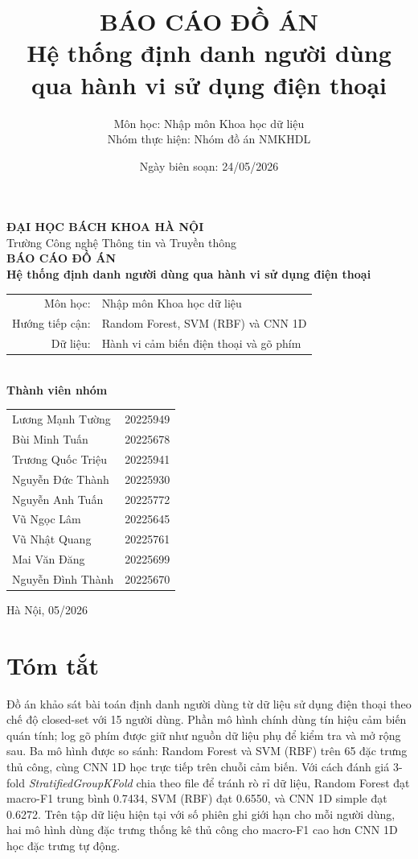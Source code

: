 \documentclass[12pt,a4paper]{article}
\title{\textbf{BÁO CÁO ĐỒ ÁN}\\[0.4cm]
\Large Hệ thống định danh người dùng qua hành vi sử dụng điện thoại}
\author{
Môn học: Nhập môn Khoa học dữ liệu\\
Nhóm thực hiện: Nhóm đồ án NMKHDL
}
\date{Ngày biên soạn: 24/05/2026}
\begin{document}
\hypersetup{pageanchor=false}
\begin{titlepage}
    \centering
    {\Large \textbf{ĐẠI HỌC BÁCH KHOA HÀ NỘI}}\\
    {\large Trường Công nghệ Thông tin và Truyền thông}\\[2.0cm]

    {\LARGE \textbf{BÁO CÁO ĐỒ ÁN}}\\[0.6cm]
    {\Large \textbf{Hệ thống định danh người dùng qua hành vi sử dụng điện thoại}}\\[1.2cm]

    \begin{tabular}{rl}
        Môn học: & Nhập môn Khoa học dữ liệu \\
        Hướng tiếp cận: & Random Forest, SVM (RBF) và CNN 1D \\
        Dữ liệu: & Hành vi cảm biến điện thoại và gõ phím \\
    \end{tabular}\\[1.6cm]

    \textbf{Thành viên nhóm}\\[0.3cm]
    \begin{tabular}{ll}
        Lương Mạnh Tường & 20225949 \\
        Bùi Minh Tuấn & 20225678 \\
        Trương Quốc Triệu & 20225941 \\
        Nguyễn Đức Thành & 20225930 \\
        Nguyễn Anh Tuấn & 20225772 \\
        Vũ Ngọc Lâm & 20225645 \\
        Vũ Nhật Quang & 20225761 \\
        Mai Văn Đăng & 20225699 \\
        Nguyễn Đình Thành & 20225670 \\
    \end{tabular}

    \vfill
    Hà Nội, 05/2026
\end{titlepage}

\hypersetup{pageanchor=true}
\tableofcontents
\newpage
{}

\section*{Tóm tắt}

Đồ án khảo sát bài toán định danh người dùng từ dữ liệu sử dụng điện thoại theo chế độ closed-set với 15 người dùng. Phần mô hình chính dùng tín hiệu cảm biến quán tính; log gõ phím được giữ như nguồn dữ liệu phụ để kiểm tra và mở rộng sau. Ba mô hình được so sánh: Random Forest và SVM (RBF) trên 65 đặc trưng thủ công, cùng CNN 1D học trực tiếp trên chuỗi cảm biến. Với cách đánh giá 3-fold \textit{StratifiedGroupKFold} chia theo file để tránh rò rỉ dữ liệu, Random Forest đạt macro-F1 trung bình 0.7434, SVM (RBF) đạt 0.6550, và CNN 1D simple đạt 0.6272. Trên tập dữ liệu hiện tại với số phiên ghi giới hạn cho mỗi người dùng, hai mô hình dùng đặc trưng thống kê thủ công cho macro-F1 cao hơn CNN 1D học đặc trưng tự động.
\end{document}
